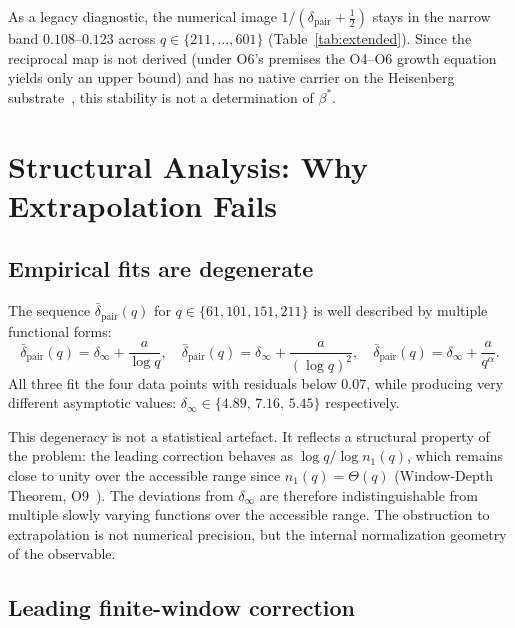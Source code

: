 \documentclass[11pt,a4paper]{article}
\theoremstyle{definition}
\newcommand{\dpair}{\delta_{\mathrm{pair}}}
\newcommand{\dpairmean}{\bar{\delta}_{\mathrm{pair}}}
\newcommand{\bstar}{\beta^{*}}
\begin{document}
      As a legacy diagnostic, the numerical image
      $1/(\dpair + \tfrac12)$ stays in the narrow band $0.108$--$0.123$ across
      $q \in \{211, \dots, 601\}$ (Table~\ref{tab:extended}).  Since the reciprocal map is not
      derived (under O6's premises the O4--O6 growth equation yields only an upper bound) and has no native carrier on
      the Heisenberg substrate~\cite{Beau2026sgn}, this stability is not a determination of
      $\bstar$.

  \section{Structural Analysis: Why Extrapolation Fails}

    \subsection{Empirical fits are degenerate}

      The sequence $\dpairmean(q)$ for $q \in \{61, 101, 151, 211\}$ is well described by
      multiple functional forms:
      \begin{equation}
        \dpairmean(q) = \delta_\infty + \frac{a}{\log q}, \quad
        \dpairmean(q) = \delta_\infty + \frac{a}{(\log q)^2}, \quad
        \dpairmean(q) = \delta_\infty + \frac{a}{q^\alpha}.
      \end{equation}
      All three fit the four data points with residuals below $0.07$, while producing
      very different asymptotic values:
      $\delta_\infty \in \{4.89,\, 7.16,\, 5.45\}$ respectively.

      This degeneracy is not a statistical artefact.
      It reflects a structural property of the problem: the leading correction behaves as
      $\log q / \log n_1(q)$, which remains close to unity over the accessible range
      since $n_1(q) = \Theta(q)$ (Window-Depth Theorem, O9~\cite{Beau2026a13}).
      The deviations from $\delta_\infty$ are therefore indistinguishable from multiple
      slowly varying functions over the accessible range.
      The obstruction to extrapolation is not numerical precision,
      but the internal normalization geometry of the observable.

    \subsection{Leading finite-window correction}
\end{document}
